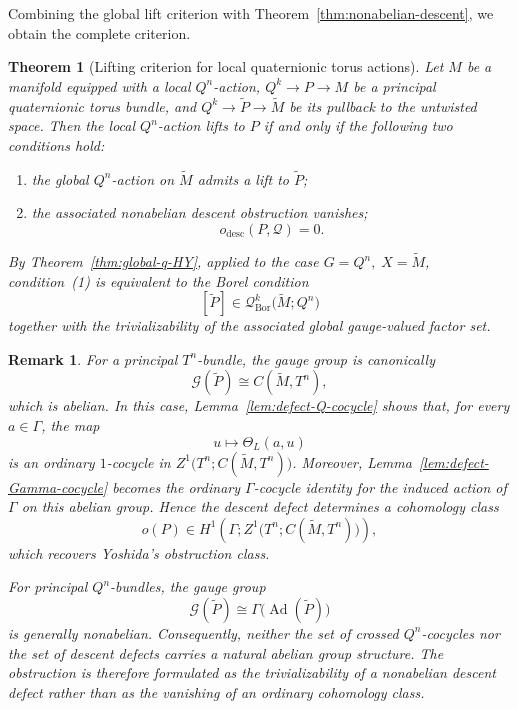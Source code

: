 \documentclass[11pt,a4paper]{article}
\numberwithin{equation}{section}
\newtheorem{remark}[definition]{Remark}
\newtheorem{thm}[definition]{Theorem}
\theoremstyle{named}
\begin{document}
Combining the global lift criterion with Theorem~\ref{thm:nonabelian-descent}, we obtain the complete criterion.

\begin{thm}[Lifting criterion for local quaternionic torus actions]
\label{thm:complete-local-lifting}
Let \(M\) be a manifold equipped with a local \(Q^n\)-action, $Q^k\longrightarrow P\longrightarrow M$ be a principal quaternionic torus bundle, and $Q^k\longrightarrow\widetilde P\longrightarrow\widetilde M$ be its pullback to the untwisted space. Then the local \(Q^n\)-action lifts to \(P\) if and only if the following two conditions hold:
\begin{enumerate}
\item[(1)] the global \(Q^n\)-action on \(\widetilde M\) admits a lift to \(\widetilde P\);

\item[(2)] the associated nonabelian descent obstruction vanishes;
\[
o_{\mathrm{desc}}(P,\mathcal Q)=0.
\]
\end{enumerate}

By Theorem~\ref{thm:global-q-HY}, applied to the case $G=Q^n,\;
X=\widetilde M$,
condition~\textup{(1)} is equivalent to the Borel condition
\[
[\widetilde P]
\in
\mathcal Q^k_{\mathrm{Bor}}\bigl(\widetilde M;Q^n\bigr)
\]
together with the trivializability of the associated global gauge-valued factor set.
\end{thm}

\begin{remark}
For a principal \(T^n\)-bundle, the gauge group is canonically
\[
\mathcal G(\widetilde P)
\cong
C(\widetilde M,T^n),
\]
which is abelian. In this case, Lemma~\ref{lem:defect-Q-cocycle} shows that, for every \(a\in\Gamma\), the map
\[
u\longmapsto\Theta_L(a,u)
\]
is an ordinary \(1\)-cocycle in $Z^1\bigl(T^n;C(\widetilde M,T^n)\bigr)$.
Moreover, Lemma~\ref{lem:defect-Gamma-cocycle} becomes the ordinary \(\Gamma\)-cocycle identity for the induced action of \(\Gamma\) on this abelian group. Hence the descent defect determines a cohomology class
\[
o(P)
\in
H^1\!\left(
\Gamma;
Z^1\bigl(T^n;C(\widetilde M,T^n)\bigr)
\right),
\]
which recovers Yoshida's obstruction class.

For principal \(Q^n\)-bundles, the gauge group
\[
\mathcal G(\widetilde P)
\cong
\Gamma\bigl(\operatorname{Ad}(\widetilde P)\bigr)
\]
is generally nonabelian. Consequently, neither the set of crossed \(Q^n\)-cocycles nor the set of descent defects carries a natural abelian group structure. The obstruction is therefore formulated as the trivializability of a nonabelian descent defect rather than as the vanishing of an ordinary cohomology class.
\end{remark}
\end{document}
